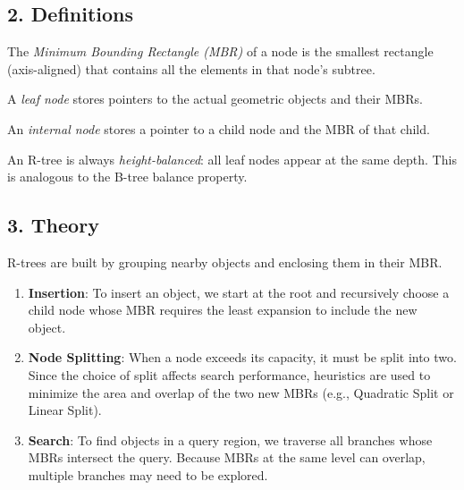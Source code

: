 \subsection{2. Definitions}
\begin{definition}
\label{def:rt_mbr}
The \emph{Minimum Bounding Rectangle (MBR)} of a node is the smallest rectangle (axis-aligned) that contains all the elements in that node's subtree.
\end{definition}

\begin{definition}
\label{def:rt_leaf}
A \emph{leaf node} stores pointers to the actual geometric objects and their MBRs.
\end{definition}

\begin{definition}
\label{def:rt_internal}
An \emph{internal node} stores a pointer to a child node and the MBR of that child.
\end{definition}

\begin{definition}
\label{def:rt_balance}
An R-tree is always \emph{height-balanced}: all leaf nodes appear at the same depth. This is analogous to the B-tree balance property.
\end{definition}

\subsection{3. Theory}
R-trees are built by grouping nearby objects and enclosing them in their MBR.
\begin{enumerate}
    \item \textbf{Insertion}: To insert an object, we start at the root and recursively choose a child node whose MBR requires the least expansion to include the new object.
    \item \textbf{Node Splitting}: When a node exceeds its capacity, it must be split into two. Since the choice of split affects search performance, heuristics are used to minimize the area and overlap of the two new MBRs (e.g., Quadratic Split or Linear Split).
    \item \textbf{Search}: To find objects in a query region, we traverse all branches whose MBRs intersect the query. Because MBRs at the same level can overlap, multiple branches may need to be explored.
\end{enumerate}

